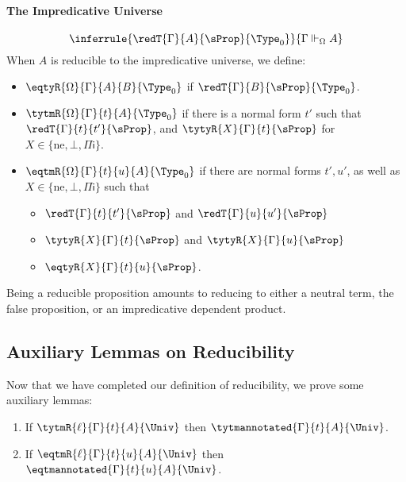 \paragraph{The Impredicative Universe}
\[
  \inferrule{\redT{\Gamma}{A}{\sProp}{\Type_0}}
            {\Gamma \Vdash_{\Omega} A}
\]
When $A$ is reducible to the impredicative universe, we define:
\begin{itemize}
  \item \( \eqtyR{\Omega}{\Gamma}{A}{B}{\Type_0} \) if \( \redT{\Gamma}{B}{\sProp}{\Type_0} \).
  \item \( \tytmR{\Omega}{\Gamma}{t}{A}{\Type_0} \) if there is a normal form \( t' \) such that
    \( \redT{\Gamma}{t}{t'}{\sProp} \), and \( \tytyR{X}{\Gamma}{t}{\sProp} \) for
    \( X \in \{ \mathrm{ne}, \bot, {\Pi \mathsf{i}}\} \).
  \item \( \eqtmR{\Omega}{\Gamma}{t}{u}{A}{\Type_0} \) if there are normal forms \( t', u' \), as well
  as \( X \in \{ \mathrm{ne}, \bot, {\Pi \mathsf{i}}\} \) such that
    \begin{itemize}
    \item \( \redT{\Gamma}{t}{t'}{\sProp} \) and \( \redT{\Gamma}{u}{u'}{\sProp} \)
    \item \( \tytyR{X}{\Gamma}{t}{\sProp} \) and \( \tytyR{X}{\Gamma}{u}{\sProp} \)
    \item  \( \eqtyR{X}{\Gamma}{t}{u}{\sProp} \).
    \end{itemize}
\end{itemize}
Being a reducible proposition amounts to reducing to either a neutral term,
the false proposition, or an impredicative dependent product.

\subsection{Auxiliary Lemmas on Reducibility}

Now that we have completed our definition of reducibility, we prove
some auxiliary lemmas:

\begin{lemma} \phantom{a}
  \begin{enumerate}
    \item If \( \tytmR{\ell}{\Gamma}{t}{A}{\Univ} \) then \( \tytmannotated{\Gamma}{t}{A}{\Univ} \).
    \item If \( \eqtmR{\ell}{\Gamma}{t}{u}{A}{\Univ} \) then \( \eqtmannotated{\Gamma}{t}{u}{A}{\Univ} \).
  \end{enumerate}
\end{lemma}

